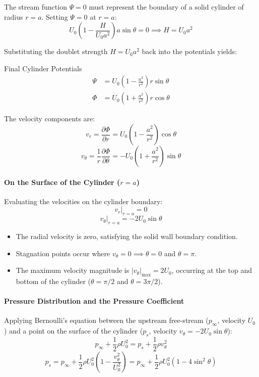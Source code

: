 The stream function $\Psi = 0$ must represent the boundary of a solid cylinder of radius $r = a$. Setting $\Psi = 0$ at $r = a$:
$$U_0 \left( 1 - \frac{H}{U_0 a^2} \right) a \sin\theta = 0 \implies H = U_0 a^2$$

Substituting the doublet strength $H = U_0 a^2$ back into the potentials yields:
\begin{eqbox}{Final Cylinder Potentials}
\begin{align*}
\Psi &= U_0 \left( 1 - \frac{a^2}{r^2} \right) r \sin\theta \\
\Phi &= U_0 \left( 1 + \frac{a^2}{r^2} \right) r \cos\theta
\end{align*}
\end{eqbox}

The velocity components are:
$$v_r = \frac{\partial \Phi}{\partial r} = U_0 \left( 1 - \frac{a^2}{r^2} \right) \cos\theta$$
$$v_\theta = \frac{1}{r} \frac{\partial \Phi}{\partial \theta} = -U_0 \left( 1 + \frac{a^2}{r^2} \right) \sin\theta$$

\paragraph{On the Surface of the Cylinder ($r = a$)}
Evaluating the velocities on the cylinder boundary:
$$v_r\big|_{r=a} = 0$$
$$v_\theta\big|_{r=a} = -2 U_0 \sin\theta$$

\begin{itemize}
    \item The radial velocity is zero, satisfying the solid wall boundary condition.
    \item Stagnation points occur where $v_\theta = 0 \implies \theta = 0$ and $\theta = \pi$.
    \item The maximum velocity magnitude is $|v_\theta|_{\text{max}} = 2 U_0$, occurring at the top and bottom of the cylinder ($\theta = \pi/2$ and $\theta = 3\pi/2$).
\end{itemize}

\paragraph{Pressure Distribution and the Pressure Coefficient}

Applying Bernoulli's equation between the upstream free-stream ($p_\infty$, velocity $U_0$) and a point on the surface of the cylinder ($p_s$, velocity $v_\theta = -2 U_0 \sin\theta$):
$$p_\infty + \frac{1}{2}\rho U_0^2 = p_s + \frac{1}{2}\rho v_\theta^2$$
$$p_s = p_\infty + \frac{1}{2}\rho U_0^2 \left( 1 - \frac{v_\theta^2}{U_0^2} \right) = p_\infty + \frac{1}{2}\rho U_0^2 \left( 1 - 4 \sin^2\theta \right)$$

